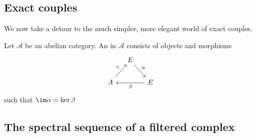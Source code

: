 \documentclass[main.tex]{subfiles}
\begin{document}
\subsection{Exact couples}
\label{ssc:exact_couples}

We now take a detour to the much simpler, more elegant world of exact couples.

\begin{definition}
  \label{def:exact_couple}
  Let $\mathcal{A}$ be an abelian category. An  in $\mathcal{A}$ consists of objects and morphisms
  \begin{equation*}
    \begin{tikzcd}[column sep=small]
      & E
      \arrow[dr, "\alpha"]
      \\
      A
      \arrow[ur, "\gamma"]
      && E
      \arrow[ll, "\beta"]
    \end{tikzcd}
  \end{equation*}
  such that $\im \alpha = \ker \beta$
\end{definition}

\subsection{The spectral sequence of a filtered complex}
\label{ssc:the_spectral_sequence_of_a_filtered_complex}
\end{document}
